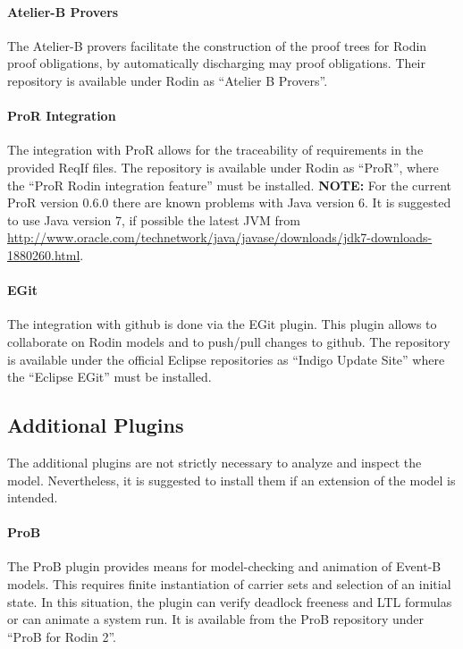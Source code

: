 \documentclass[10pt,a4paper]{article}
\begin{document}
\paragraph{Atelier-B Provers}
\label{sec:atelier-b-provers}

The Atelier-B provers facilitate the construction of the proof trees for Rodin
proof obligations, by automatically discharging may proof obligations. Their
repository is available under Rodin as ``Atelier B Provers''.

\paragraph{ProR Integration}
\label{sec:pror-integration}

The integration with ProR allows for the traceability of requirements in the
provided ReqIf files. The repository is available under Rodin as ``ProR'', where
the ``ProR Rodin integration feature'' must be installed. {\bf NOTE: } For the
current ProR version 0.6.0 there are known problems with Java version 6. It is
suggested to use Java version 7, if possible the latest JVM from
\url{http://www.oracle.com/technetwork/java/javase/downloads/jdk7-downloads-1880260.html}.

\paragraph{EGit}
\label{sec:egit}

The integration with github is done via the EGit plugin. This plugin allows to
collaborate on Rodin models and to push/pull changes to github. The repository
is available under the official Eclipse repositories as ``Indigo Update Site''
where the ``Eclipse EGit'' must be installed.

\subsection{Additional Plugins}
\label{sec:additional-plugins}

The additional plugins are not strictly necessary to analyze and inspect the
model. Nevertheless, it is suggested to install them if an extension of the
model is intended.

\paragraph{ProB}
\label{sec:prob}

The ProB plugin provides means for model-checking and animation of Event-B
models. This requires finite instantiation of carrier sets and selection of an
initial state. In this situation, the plugin can verify deadlock freeness and
LTL formulas or can animate a system run. It is available from the ProB
repository under ``ProB for Rodin 2''.
\end{document}

